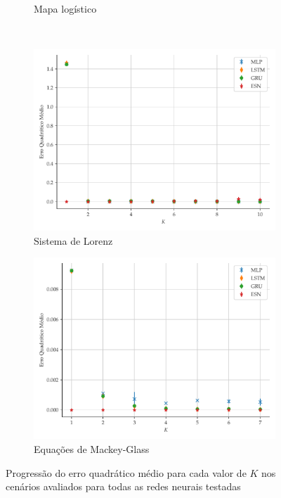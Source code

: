 \documentclass[a4paper, 12pt]{article}
\begin{document}
\begin{figure}[!ht]
\begin{subfigure}[t]{0.4\textwidth}
         \caption{Mapa logístico}
     \end{subfigure}
     \\
     \centering
     \begin{subfigure}[t]{0.4\textwidth}
         \includegraphics[scale=0.4]{progressao-k-lorenz.pdf}
         \caption{Sistema de Lorenz}
     \end{subfigure}
     \centering
     \begin{subfigure}[t]{0.4\textwidth} 
         \includegraphics[scale=0.4]{progressao-k-mackeyglass.pdf}
         \caption{Equações de Mackey-Glass}
     \end{subfigure}  
     \centering   
     \caption{Progressão do erro quadrático médio para cada valor de $K$ nos cenários avaliados para todas as redes neurais testadas}
     \label{fig:mse-progression}
\end{figure}
\end{document}
